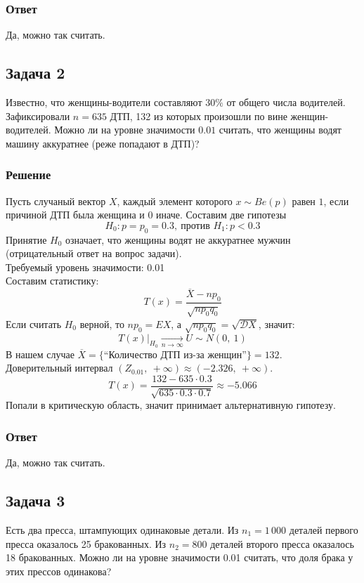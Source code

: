 \documentclass[12pt, a4paper]{article}
\newcommand{\dev}{\mathcal{D}}
\begin{document}
\subsubsection*{Ответ}
Да, можно так считать.
\subsection*{Задача 2}
Известно, что женщины-водители составляют $30\%$ от общего числа водителей. Зафиксировали $n = 635$ ДТП, 132 из которых произошли по вине женщин-водителей. Можно ли на уровне значимости $0.01$ считать, что женщины водят машину аккуратнее (реже попадают в ДТП)?
\subsubsection*{Решение}
Пусть случаный вектор $X$, каждый элемент которого $x\sim Be(p)$ равен $1$, если причиной ДТП была женщина и 0 иначе.
Составим две гипотезы
\[H_0: p = p_0 = 0.3,\ \text{против } H_1: p < 0.3\]
Принятие $H_0$ означает, что женщины водят не аккуратнее мужчин (отрицательный ответ на вопрос задачи).\\
Требуемый уровень значимости: 0.01\\
Составим статистику:
\[T(x) = \frac{\overline{X} - np_0}{\sqrt{np_0 q_0}}\]
Если считать $H_0$ верной, то $np_0 = EX$, а $\sqrt{np_0q_0} = \sqrt{\dev X}$, значит:
\[T(x)\big|_{H_0} \xrightarrow[n\to \infty]{}U\sim N(0,\ 1)\]
В нашем случае $\overline{X} = \{\text{``Количество ДТП из-за женщин''}\} = 132$.\\
Доверительный интервал $(Z_{0.01},\ +\infty) \approx (-2.326,\ +\infty)$.
\[T(x) = \frac{132 - 635\cdot 0.3}{\sqrt{635\cdot 0.3\cdot 0.7}} \approx -5.066\]
Попали в критическую область, значит принимает альтернативную гипотезу.
\subsubsection*{Ответ}
Да, можно так считать.
\subsection*{Задача 3}
Есть два пресса, штампующих одинаковые детали. Из $n_1 = 1\,000$ деталей первого пресса оказалось 25 бракованных. Из $n_2 = 800$ деталей второго пресса оказалось 18 бракованных. Можно ли на уровне значимости 0.01 считать, что доля брака у этих прессов одинакова?
\end{document}
